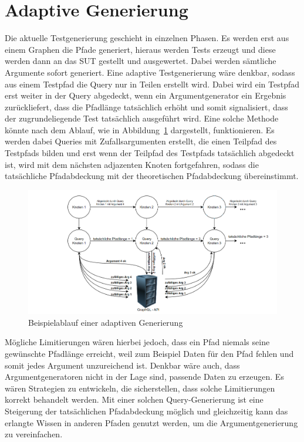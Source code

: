\section{Adaptive Generierung}

Die aktuelle Testgenerierung geschieht in einzelnen Phasen.
Es werden erst aus einem Graphen die Pfade generiert, hieraus werden Tests erzeugt und diese werden dann an das SUT gestellt und ausgewertet.
Dabei werden sämtliche Argumente sofort generiert.
Eine adaptive Testgenerierung wäre denkbar, sodass aus einem Testpfad die Query nur in Teilen erstellt wird.
Dabei wird ein Testpfad erst weiter in der Query abgedeckt, wenn ein Argumentgenerator ein Ergebnis zurückliefert, dass die Pfadlänge tatsächlich erhöht und somit signalisiert, dass der zugrundeliegende Test tatsächlich ausgeführt wird.
Eine solche Methode könnte nach dem Ablauf, wie in Abbildung~\ref{adaptive} dargestellt, funktionieren.
Es werden dabei Queries mit Zufallsargumenten erstellt, die einen Teilpfad des Testpfads bilden und erst wenn der Teilpfad des Testpfads tatsächlich abgedeckt ist, wird mit dem nächsten adjazenten Knoten fortgefahren,
sodass die tatsächliche Pfadabdeckung mit der theoretischen Pfadabdeckung übereinstimmt.

\begin{figure}[H]
    \begin{center}
        \includegraphics[width=\textwidth,keepaspectratio]{img/ablauffuturework}
    \end{center}
    \caption{Beispielablauf einer adaptiven Generierung}
    \label{adaptive}
\end{figure}

Mögliche Limitierungen wären hierbei jedoch, dass ein Pfad niemals seine gewünschte Pfadlänge erreicht, weil zum Beispiel Daten für den Pfad fehlen und somit jedes Argument unzureichend ist.
Denkbar wäre auch, dass Argumentgeneratoren nicht in der Lage sind, passende Daten zu erzeugen.
Es wären Strategien zu entwickeln, die sicherstellen, dass solche Limitierungen korrekt behandelt werden.
Mit einer solchen Query-Generierung ist eine Steigerung der tatsächlichen Pfadabdeckung möglich und gleichzeitig kann das erlangte Wissen in anderen Pfaden genutzt werden, um die Argumentgenerierung zu vereinfachen.




